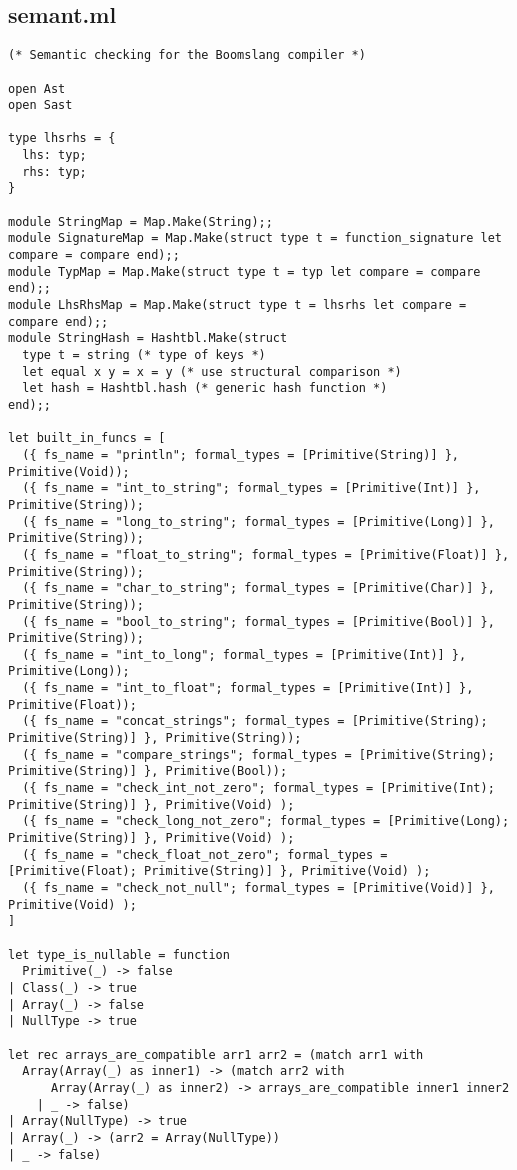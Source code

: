 \documentclass{article}
\begin{document}
\subsection{semant.ml} 
\begin{verbatim}
(* Semantic checking for the Boomslang compiler *)

open Ast
open Sast

type lhsrhs = {
  lhs: typ;
  rhs: typ;
}

module StringMap = Map.Make(String);;
module SignatureMap = Map.Make(struct type t = function_signature let compare = compare end);;
module TypMap = Map.Make(struct type t = typ let compare = compare end);;
module LhsRhsMap = Map.Make(struct type t = lhsrhs let compare = compare end);;
module StringHash = Hashtbl.Make(struct
  type t = string (* type of keys *)
  let equal x y = x = y (* use structural comparison *)
  let hash = Hashtbl.hash (* generic hash function *)
end);;

let built_in_funcs = [
  ({ fs_name = "println"; formal_types = [Primitive(String)] }, Primitive(Void));
  ({ fs_name = "int_to_string"; formal_types = [Primitive(Int)] }, Primitive(String));
  ({ fs_name = "long_to_string"; formal_types = [Primitive(Long)] }, Primitive(String));
  ({ fs_name = "float_to_string"; formal_types = [Primitive(Float)] }, Primitive(String));
  ({ fs_name = "char_to_string"; formal_types = [Primitive(Char)] }, Primitive(String));
  ({ fs_name = "bool_to_string"; formal_types = [Primitive(Bool)] }, Primitive(String));
  ({ fs_name = "int_to_long"; formal_types = [Primitive(Int)] }, Primitive(Long));
  ({ fs_name = "int_to_float"; formal_types = [Primitive(Int)] }, Primitive(Float));
  ({ fs_name = "concat_strings"; formal_types = [Primitive(String); Primitive(String)] }, Primitive(String)); 
  ({ fs_name = "compare_strings"; formal_types = [Primitive(String); Primitive(String)] }, Primitive(Bool));
  ({ fs_name = "check_int_not_zero"; formal_types = [Primitive(Int); Primitive(String)] }, Primitive(Void) );
  ({ fs_name = "check_long_not_zero"; formal_types = [Primitive(Long); Primitive(String)] }, Primitive(Void) );
  ({ fs_name = "check_float_not_zero"; formal_types = [Primitive(Float); Primitive(String)] }, Primitive(Void) );
  ({ fs_name = "check_not_null"; formal_types = [Primitive(Void)] }, Primitive(Void) );
]

let type_is_nullable = function
  Primitive(_) -> false
| Class(_) -> true
| Array(_) -> false
| NullType -> true

let rec arrays_are_compatible arr1 arr2 = (match arr1 with
  Array(Array(_) as inner1) -> (match arr2 with
      Array(Array(_) as inner2) -> arrays_are_compatible inner1 inner2
    | _ -> false)
| Array(NullType) -> true
| Array(_) -> (arr2 = Array(NullType))
| _ -> false)


\end{verbatim}
\end{document}
